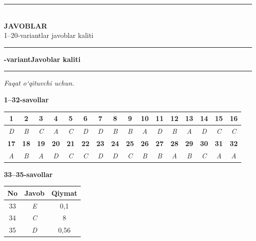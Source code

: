 \documentclass[11pt,a4paper]{article}
\newcommand{\hdrpill}[1]{\begin{tikzpicture}[baseline=0pt]\node[fill=ygreen,text=white,rounded corners=8pt,inner xsep=10pt,inner ysep=5pt,font=\fontsize{13}{15}\bfseries\selectfont] at (0,0.475){#1};\end{tikzpicture}}
\newcommand{\curvar}{}\fancyhead[R]{\hdrpill{\curvar}}
\begin{document}
\newpage\renewcommand{\curvar}{}\thispagestyle{first}
\vspace*{6cm}\begin{center}{\color{ygreen}\rule{0.6\linewidth}{1.6pt}}\\[14pt]{\fontsize{34}{38}\selectfont\bfseries JAVOBLAR}\\[10pt]{\large 1--20-variantlar javoblar kaliti}\\[14pt]{\color{ygreen}\rule{0.6\linewidth}{1.6pt}}\end{center}
\renewcommand{\curvar}{Javoblar}
\newpage
\noindent\textbf{\fontsize{13}{15}-variant}\hfill \textbf{Javoblar kaliti}\par\smallskip\hrule\smallskip
\textit{Faqat o`qituvchi uchun.}\par\medskip
\noindent\textbf{1--32-savollar}\par\smallskip
\noindent\begin{tabular}{|c|c|c|c|c|c|c|c|c|c|c|c|c|c|c|c|}\hline
\textbf{1} & \textbf{2} & \textbf{3} & \textbf{4} & \textbf{5} & \textbf{6} & \textbf{7} & \textbf{8} & \textbf{9} & \textbf{10} & \textbf{11} & \textbf{12} & \textbf{13} & \textbf{14} & \textbf{15} & \textbf{16}\\\hline
\textsl{D} & \textsl{B} & \textsl{C} & \textsl{A} & \textsl{C} & \textsl{D} & \textsl{D} & \textsl{B} & \textsl{B} & \textsl{A} & \textsl{D} & \textsl{B} & \textsl{A} & \textsl{D} & \textsl{C} & \textsl{C}\\\hline
\textbf{17} & \textbf{18} & \textbf{19} & \textbf{20} & \textbf{21} & \textbf{22} & \textbf{23} & \textbf{24} & \textbf{25} & \textbf{26} & \textbf{27} & \textbf{28} & \textbf{29} & \textbf{30} & \textbf{31} & \textbf{32}\\\hline
\textsl{A} & \textsl{B} & \textsl{A} & \textsl{D} & \textsl{C} & \textsl{C} & \textsl{D} & \textsl{D} & \textsl{C} & \textsl{B} & \textsl{B} & \textsl{A} & \textsl{B} & \textsl{C} & \textsl{A} & \textsl{A}\\\hline
\end{tabular}\par\medskip
\noindent\textbf{33--35-savollar}\par\smallskip
\noindent\begin{tabular}{|c|c|c|}\hline \textbf{No} & \textbf{Javob} & \textbf{Qiymat}\\\hline
33 & \textsl{E} & 0,1\\\hline
34 & \textsl{C} & 8\\\hline
35 & \textsl{D} & 0,56\\\hline
\end{tabular}\par\medskip
\end{document}
